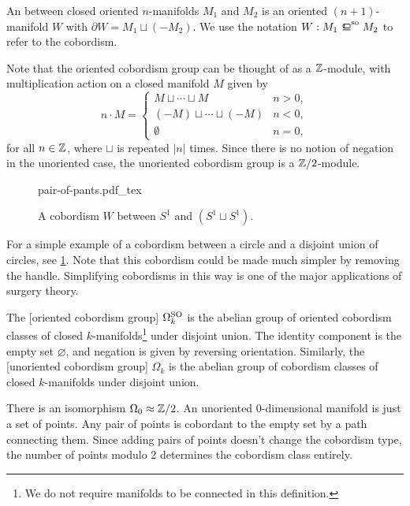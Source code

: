 \begin{definition}
	An  between closed oriented $n$-manifolds $M_1$ and $M_2$ is an oriented $(n+1)$-manifold $W$ with $\partial W = M_1\sqcup (-M_2)$. We use the notation $W : M_1\sobord M_2$ to refer to the cobordism.
\end{definition}

\begin{remark}
\end{remark}

Note that the oriented cobordism group can be thought of as a $\mathbb{Z}$-module, with multiplication action on a closed manifold $M$ given by
\[
	n \cdot M = \begin{cases} M\sqcup \cdots \sqcup M & n > 0,\\ (-M)\sqcup \cdots \sqcup (-M) & n < 0,\\ \emptyset & n=0,\end{cases}
\]
for all $n\in \mathbb{Z}$, where $\sqcup$ is repeated $|n|$ times. Since there is no notion of negation in the unoriented case, the unoriented cobordism group is a $\mathbb{Z}/2$-module.

\begin{figure}[ht]
	\centering
	{pair-of-pants.pdf_tex}
	\caption{A cobordism $W$ between $S^1$ and $(S^1\sqcup S^1)$.}\label{fig:pair-of-pants}
\end{figure}

For a simple example of a cobordism between a circle and a disjoint union of circles, see \cref{fig:pair-of-pants}. Note that this cobordism could be made much simpler by removing the handle. Simplifying cobordisms in this way is one of the major applications of surgery theory.

\begin{definition}
	The [oriented cobordism group] $\Omega^{\mathrm{SO}}_k$ is the abelian group of oriented cobordism classes of closed $k$-manifolds\footnote{We do not require manifolds to be connected in this definition.}
	under disjoint union. The identity component is the empty set $\varnothing$, and negation is given by reversing orientation. Similarly, the [unoriented cobordism group] $\Omega_k$ is the abelian group of cobordism classes of closed $k$-manifolds under disjoint union.
\end{definition}

\begin{example}
	There is an isomorphism $\Omega_0\approx \mathbb{Z}/2$. An unoriented 0-dimensional manifold is just a set of points. Any pair of points is cobordant to the empty set by a path connecting them. Since adding pairs of points doesn't change the cobordism type, the number of points modulo 2 determines the cobordism class entirely.
\end{example}

